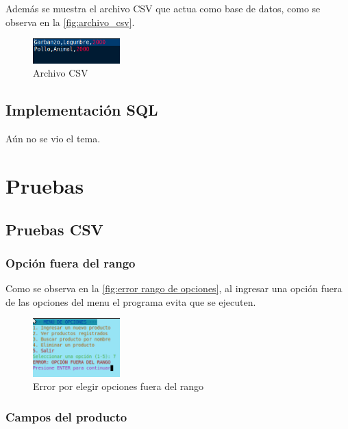 \documentclass[12pt]{article}
\begin{document}
Además se muestra el archivo CSV que actua como base de datos, como se observa en la \autoref{fig:archivo_csv}.

\begin{figure}[H]
	\centering
	\setlength{\fboxrule}{0pt}
	\includegraphics[width=0.3\textwidth]{Imagenes/archivo_csv.png}
	\caption{Archivo CSV}
	\label{fig:archivo_csv}
\end{figure} 


\subsection{Implementación SQL}
Aún no se vio el tema.
\section{Pruebas}

\subsection{Pruebas CSV}
\subsubsection{Opción fuera del rango}

Como se observa en la \autoref{fig:error rango de opciones}, al ingresar una opción fuera de las opciones del menu 
el programa evita que se ejecuten.

\begin{figure}[H]
	\centering
	\setlength{\fboxrule}{0pt}
	\includegraphics[width=0.3\textwidth]{Imagenes/error_opcion_menu.png}
	\caption{Error por elegir opciones fuera del rango}
	\label{fig:error rango de opciones}
\end{figure} 

\subsubsection{Campos del producto}
\end{document}
